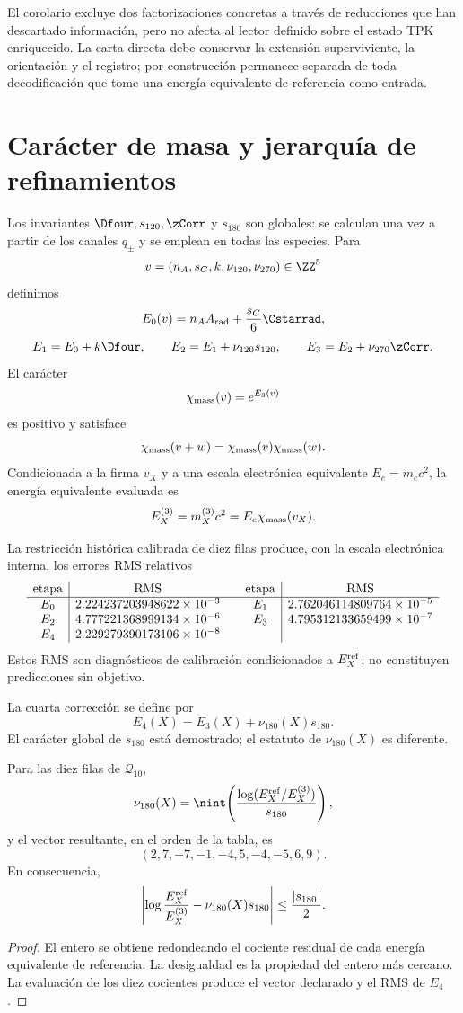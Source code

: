 El corolario excluye dos factorizaciones concretas a través de reducciones que
han descartado información, pero no afecta al lector definido sobre el estado
TPK enriquecido. La carta directa debe conservar la extensión superviviente,
la orientación y el registro; por construcción permanece separada de toda
decodificación que tome una energía equivalente de referencia como entrada.

\section{Carácter de masa y jerarquía de refinamientos}

Los invariantes \(\Dfour,s_{120},\zCorr\) y \(s_{180}\) son globales: se
calculan una vez a partir de los canales \(q_\pm\) y se emplean en todas las
especies. Para
\[
 v=(n_A,s_C,k,\nu_{120},\nu_{270})\in\ZZ^5
\]
definimos
\[
 E_0(v)=n_AA_{\rm rad}+\frac{s_C}{6}\Cstarrad,
\]
\[
 E_1=E_0+k\Dfour,
 \qquad
 E_2=E_1+\nu_{120}s_{120},
 \qquad
 E_3=E_2+\nu_{270}\zCorr.
\]
El carácter
\[
 \chi_{\rm mass}(v)=e^{E_3(v)}
\]
es positivo y satisface
\[
 \chi_{\rm mass}(v+w)=\chi_{\rm mass}(v)\chi_{\rm mass}(w).
\]
Condicionada a la firma \(v_X\) y a una escala electrónica equivalente
\(E_e=m_ec^2\), la energía equivalente evaluada es
\[
 E_X^{(3)}=m_X^{(3)}c^2
 =E_e\chi_{\rm mass}(v_X).
\]

La restricción histórica calibrada de diez filas produce, con la escala electrónica interna,
los errores RMS relativos
\[
\begin{array}{c|c@{\qquad}c|c}
\text{etapa}&\operatorname{RMS}&\text{etapa}&\operatorname{RMS}\\ \hline
E_0&2.224237203948622\times10^{-3}&
E_1&2.762046114809764\times10^{-5}\\
E_2&4.777221368999134\times10^{-6}&
E_3&4.795312133659499\times10^{-7}\\
E_4&2.229279390173106\times10^{-8}&&
\end{array}
\]
Estos RMS son diagnósticos de calibración condicionados a
\(E_X^{\rm ref}\); no constituyen predicciones sin objetivo.

La cuarta corrección se define por
\[
 E_4(X)=E_3(X)+\nu_{180}(X)s_{180}.
\]
El carácter global de \(s_{180}\) está demostrado; el estatuto de
\(\nu_{180}(X)\) es diferente.

\begin{theorem}
\label{thm:e4-inversa-atlas}
Para las diez filas de \(\mathcal Q_{10}\),
\[
 \nu_{180}(X)=
 \nint\!\left(
 \frac{\log(E_X^{\rm ref}/E_X^{(3)})}{s_{180}}
 \right),
\]
y el vector resultante, en el orden de la tabla, es
\[
 (2,7,-7,-1,-4,5,-4,-5,6,9).
\]
En consecuencia,
\[
 \left|
 \log\frac{E_X^{\rm ref}}{E_X^{(3)}}
 -\nu_{180}(X)s_{180}
 \right|\leq\frac{|s_{180}|}{2}.
\]
\end{theorem}
\begin{proof}
El entero se obtiene redondeando el cociente residual de cada energía
equivalente de referencia. La desigualdad es la propiedad del entero más cercano. La
evaluación de los diez cocientes produce el vector declarado y el RMS de
\(E_4\).
\end{proof}

